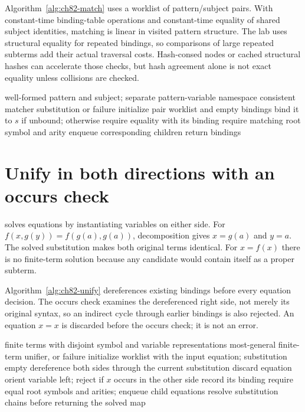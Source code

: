 Algorithm~\ref{alg:ch82-match} uses a worklist of pattern/subject pairs.
With constant-time binding-table operations and constant-time equality of shared subject identities, matching is linear in visited pattern structure.
The lab uses structural equality for repeated bindings, so comparisons of large repeated subterms add their actual traversal costs.
Hash-consed nodes or cached structural hashes can accelerate those checks, but hash agreement alone is not exact equality unless collisions are checked.

\begin{algorithm}[htbp]
\caption{Match a finite first-order pattern against one fixed subject.}
\label{alg:ch82-match}
\begin{pseudocode}
\Require well-formed pattern and subject; separate pattern-variable namespace
\Ensure consistent matcher substitution or failure
\State initialize pair worklist and empty bindings
\State bind it to $s$ if unbound; otherwise require equality with its binding
\Else
\State require matching root symbol and arity
\State enqueue corresponding children
\EndIf
\EndWhile
\State return bindings
\end{pseudocode}
\end{algorithm}

\section{Unify in both directions with an occurs check}
\label{sec:ch82-unify}
 solves equations by instantiating variables on either side.
For $f(x,g(y))=f(g(a),g(a))$, decomposition gives $x=g(a)$ and $y=a$.
The solved substitution makes both original terms identical.
For $x=f(x)$ there is no finite-term solution because any candidate would contain itself as a proper subterm.

Algorithm~\ref{alg:ch82-unify} dereferences existing bindings before every equation decision.
The occurs check examines the dereferenced right side, not merely its original syntax, so an indirect cycle through earlier bindings is also rejected.
An equation $x=x$ is discarded before the occurs check; it is not an error.

\begin{algorithm}[htbp]
\caption{Unify finite first-order terms using an explicit equation worklist.}
\label{alg:ch82-unify}
\begin{pseudocode}
\Require finite terms with disjoint symbol and variable representations
\Ensure most-general finite-term unifier, or failure
\State initialize worklist with the input equation; substitution empty
\State dereference both sides through the current substitution
 \State discard equation
\State orient variable left; reject if $x$ occurs in the other side
\State record its binding
\Else
\State require equal root symbols and arities; enqueue child equations
\EndIf
\EndWhile
\State resolve substitution chains before returning the solved map
\end{pseudocode}
\end{algorithm}

